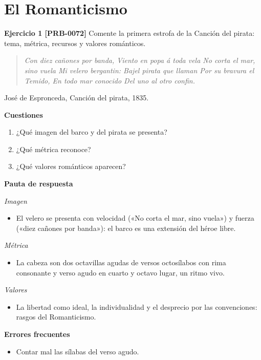 \documentclass{book}
\begin{document}
\section{El Romanticismo}

\noindent\textbf{Ejercicio 1 [PRB-0072]}
Comente la primera estrofa de la Canción del pirata: tema, métrica, recursos y valores románticos.


\begin{quote}
\itshape Con diez cañones por banda, Viento en popa á toda vela No corta el mar, sino vuela Mi velero bergantin: Bajel pirata que llaman Por su bravura el Temido, En todo mar conocido Del uno al otro confin.
\end{quote}
{\noindent\footnotesize José de Espronceda, Canción del pirata, 1835.\par}

\noindent\textbf{Cuestiones}
\begin{enumerate}
\item ¿Qué imagen del barco y del pirata se presenta?
\item ¿Qué métrica reconoce?
\item ¿Qué valores románticos aparecen?
\end{enumerate}

\noindent\textbf{Pauta de respuesta}

\noindent\textit{Imagen}
\begin{itemize}
\item El velero se presenta con velocidad («No corta el mar, sino vuela») y fuerza («diez cañones por banda»): el barco es una extensión del héroe libre.
\end{itemize}

\noindent\textit{Métrica}
\begin{itemize}
\item La cabeza son dos octavillas agudas de versos octosílabos con rima consonante y verso agudo en cuarto y octavo lugar, un ritmo vivo.
\end{itemize}

\noindent\textit{Valores}
\begin{itemize}
\item La libertad como ideal, la individualidad y el desprecio por las convenciones: rasgos del Romanticismo.
\end{itemize}

\noindent\textbf{Errores frecuentes}
\begin{itemize}
\item Contar mal las sílabas del verso agudo.
\end{itemize}
\end{document}
